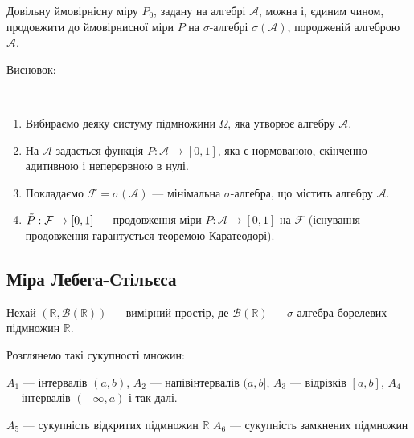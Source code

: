 \begin{theorem}
    
\end{theorem}

Довільну ймовірнісну міру $P_0$, задану на алгебрі $\mathcal{A}$,
можна і, єдиним чином, продовжити до ймовірнисної міри $P$
на $\sigma$-алгебрі $\sigma(\mathcal{A})$, породженій алгеброю 
$\mathcal{A}$.


Висновок:
\begin{conclusion}~
    \begin{enumerate}
        \item Вибираємо деяку систуму підмножини $\Omega$, яка утворює
        алгебру $\mathcal{A}$.
        
        \item На $\mathcal{A}$ задається функція $P: \mathcal{A} \rightarrow [0, 1]$,
        яка є нормованою, скінченно-адитивною і неперервною в нулі.

        \item Покладаємо $\mathcal{F} = \sigma(\mathcal{A})$ --- мінімальна
        $\sigma$-алгебра, що містить алгебру $\mathcal{A}$.

        \item $\Tilde{P}: \mathcal{F} \rightarrow [0, 1]$ --- продовження міри
        $P: \mathcal{A} \rightarrow [0, 1]$ на $\mathcal{F}$ (існування
        продовження гарантується теоремою Каратеодорі).
    \end{enumerate}
\end{conclusion}

\subsection{Міра Лебега-Стільєса}

Нехай $(\mathbb{R}, \mathcal{B}(\mathbb{R}))$ --- вимірний простір, де
$\mathcal{B}(\mathbb{R})$ --- $\sigma$-алгебра борелевих підмножин
$\mathbb{R}$.

Розглянемо такі сукупності множин:

$A_1$ --- інтервалів $(a, b)$, 
$A_2$ --- напівінтервалів $(a, b]$,
$A_3$ --- відрізків  $[a, b]$,
$A_4$ --- інтервалів  $(-\infty, a)$ і так далі.

$A_5$ --- сукупність відкритих підмножин $\mathbb{R}$
$A_6$ --- сукупність замкнених підмножин


